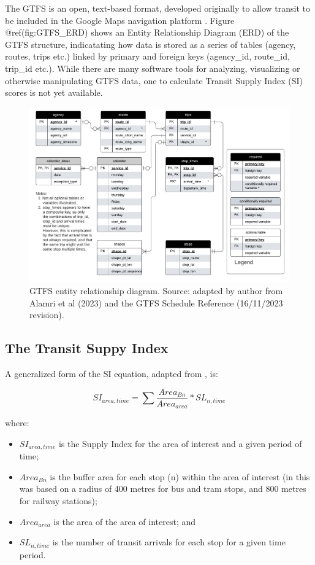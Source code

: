 \documentclass[preprint, 3p,
authoryear]{elsarticle} %
\begin{document}
The GTFS is an open, text-based format, developed originally to allow
transit to be included in the Google Maps navigation platform
\citep{GTFS}. Figure @ref(fig:GTFS\_ERD) shows an Entity Relationship
Diagram (ERD) of the GTFS structure, indicatating how data is stored as
a series of tables (agency, routes, trips etc.) linked by primary and
foreign keys (agency\_id, route\_id, trip\_id etc.). While there are
many software tools for analyzing, visualizing or otherwise manipulating
GTFS data, one to calculate Transit Supply Index (SI) scores is not yet
available.

\begin{figure}
\includegraphics[width=1\linewidth]{graphics/GTFS} \caption{GTFS entity relationship diagram. Source: adapted by author from Alamri et al (2023) and the GTFS Schedule Reference (16/11/2023 revision).}\label{fig:GTFS_ERD}
\end{figure}

\hypertarget{the-transit-suppy-index}{%
\subsection{The Transit Suppy Index}\label{the-transit-suppy-index}}

A generalized form of the SI equation, adapted from
\citet{currie2010identifying}, is:

\[SI_{area, time} = \sum{\frac{Area_{Bn}}{Area_{area}}*SL_{n, time}}\]

where:

\begin{itemize}
\item
  \(SI_{area, time}\) is the Supply Index for the area of interest and a
  given period of time;
\item
  \(Area_{Bn}\) is the buffer area for each stop (n) within the area of
  interest (in \citet{currie2010identifying} this was based on a radius
  of 400 metres for bus and tram stops, and 800 metres for railway
  stations);
\item
  \(Area_{area}\) is the area of the area of interest; and
\item
  \(SL_{n,time}\) is the number of transit arrivals for each stop for a
  given time period.
\end{itemize}
\end{document}
